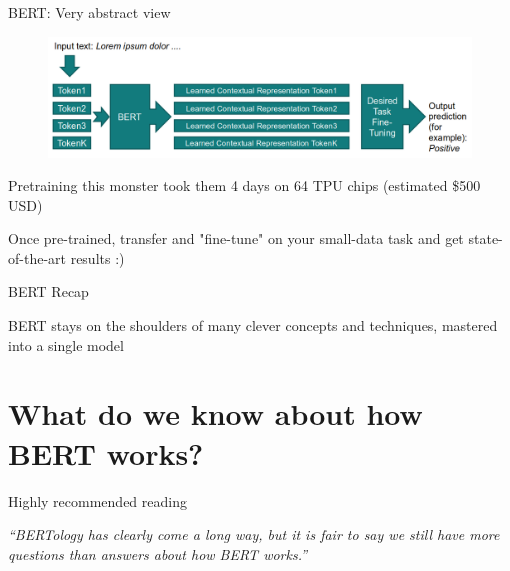 \documentclass[12pt,aspectratio=169,handout]{beamer}
\begin{document}
\begin{frame}{BERT: Very abstract view}
	
	\begin{figure}
		\includegraphics[width=\linewidth]{img/bert1.png}
	\end{figure}	
	
	Pretraining this monster took them 4 days on 64 TPU chips
	(estimated \$500 USD)
	
	\bigskip
	
	Once pre-trained, transfer and "fine-tune" on your small-data task and get state-of-the-art results :)
	
	
\end{frame}


\begin{frame}{BERT Recap}
	
	BERT stays on the shoulders of many clever concepts and techniques, mastered into a single model
	
\end{frame}

\section{What do we know about how BERT works?}

\begin{frame}{Highly recommended reading}
	
	\emph{``BERTology has clearly come a long way, but it is fair to say we still have more questions than answers about how BERT works.''}
	
	\bigskip
	
	
\end{frame}
\end{document}
